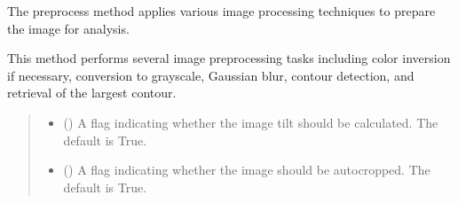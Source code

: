 \documentclass[letterpaper,10pt,english]{sphinxmanual}
\begin{document}
\begin{fulllineitems}
\begin{fulllineitems}
\label{\detokenize{forensicfit.core.tape:forensicfit.core.tape.TapeAnalyzer.__init__}}
\pysigstartsignatures
{}
\pysigstopsignatures
\end{fulllineitems}


\begin{fulllineitems}
\label{\detokenize{forensicfit.core.tape:forensicfit.core.tape.TapeAnalyzer.preprocess}}
\pysigstartsignatures
{}
\pysigstopsignatures
\sphinxAtStartPar
The preprocess method applies various image processing techniques to prepare the image for analysis.

\sphinxAtStartPar
This method performs several image preprocessing tasks including color inversion if necessary, conversion to grayscale, Gaussian blur, contour detection, and retrieval of the largest contour.
\begin{quote}\begin{description}
\begin{itemize}
\item {} 
\sphinxAtStartPar
{} (\sphinxstyleliteralemphasis{\sphinxupquote{, }}) \textendash{} A flag indicating whether the image tilt should be calculated. The default is True.

\item {} 
\sphinxAtStartPar
{} (\sphinxstyleliteralemphasis{\sphinxupquote{, }}) \textendash{} A flag indicating whether the image should be auto\sphinxhyphen{}cropped. The default is True.


\end{itemize}
\end{description}
\end{quote}
\end{fulllineitems}
\end{fulllineitems}
\end{document}
